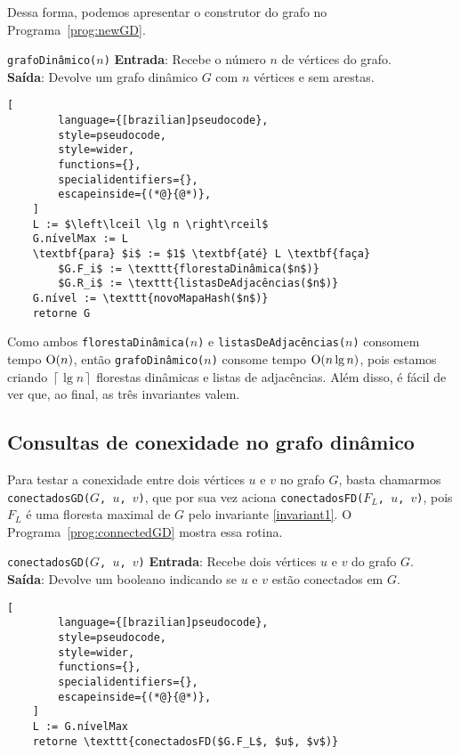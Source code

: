 Dessa forma, podemos apresentar o construtor do grafo no Programa~\ref{prog:newGD}. 

\begin{programruledcaption}{\texttt{grafoDinâmico($n$)} \label{prog:newGD}}
    \noindent\textbf{Entrada}: Recebe o número $n$ de vértices do grafo. \\
    \textbf{Saída}: Devolve um grafo dinâmico $G$ com $n$ vértices e sem arestas.
    \vspace{-0.5\baselineskip}
    \begin{lstlisting}[
        language={[brazilian]pseudocode},
        style=pseudocode,
        style=wider,
        functions={},
        specialidentifiers={},
        escapeinside={(*@}{@*)},
    ]
    L := $\left\lceil \lg n \right\rceil$
    G.nívelMax := L
    \textbf{para} $i$ := $1$ \textbf{até} L \textbf{faça}
        $G.F_i$ := \texttt{florestaDinâmica($n$)}
        $G.R_i$ := \texttt{listasDeAdjacências($n$)}
    G.nível := \texttt{novoMapaHash($n$)}
    retorne G
    \end{lstlisting}
    \vspace{-0.5\baselineskip}
\end{programruledcaption}

Como ambos \texttt{florestaDinâmica($n$)} e \texttt{listasDeAdjacências($n$)} consomem tempo $\mathrm{O}(n)$, então \texttt{grafoDinâmico($n$)} consome tempo $\mathrm{O}(n \lg n)$, pois estamos criando $\left\lceil \lg n \right\rceil$ florestas dinâmicas e listas de adjacências. Além disso, é fácil de ver que, ao final, as três invariantes valem.

\subsection{Consultas de conexidade no grafo dinâmico}
\label{sec:dynamic-graph-connectivity-queries}

Para testar a conexidade entre dois vértices $u$ e $v$ no grafo $G$, basta chamarmos \texttt{conectadosGD($G$, $u$, $v$)}, que por sua vez aciona \texttt{conectadosFD($F_L$, $u$, $v$)}, pois $F_L$ é uma floresta maximal de $G$ pelo invariante \ref{invariant1}. O Programa~\ref{prog:connectedGD} mostra essa rotina.

\begin{programruledcaption}{\texttt{conectadosGD($G$, $u$, $v$)} \label{prog:connectedGD}}
    \noindent\textbf{Entrada}: Recebe dois vértices $u$ e $v$ do grafo $G$. \\
    \textbf{Saída}: Devolve um booleano indicando se $u$ e $v$ estão conectados em $G$.
    \vspace{-0.5\baselineskip}
    \begin{lstlisting}[
        language={[brazilian]pseudocode},
        style=pseudocode,
        style=wider,
        functions={},
        specialidentifiers={},
        escapeinside={(*@}{@*)},
    ]
    L := G.nívelMax
    retorne \texttt{conectadosFD($G.F_L$, $u$, $v$)}
    \end{lstlisting}
    \vspace{-0.5\baselineskip}
\end{programruledcaption}

